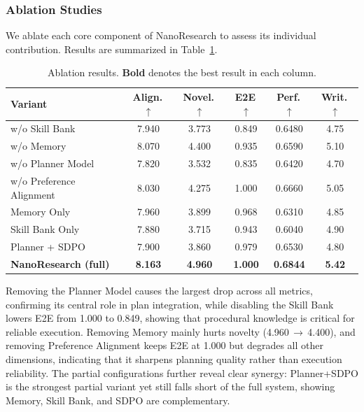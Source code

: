\documentclass{opendatalab}
\begin{document}
\subsubsection{Ablation Studies}

We ablate each core component of NanoResearch to assess its individual
contribution. Results are summarized in Table~\ref{tab:ablation}.

\begin{table}[ht]
  \centering
  \footnotesize
  \caption{Ablation results. \textbf{Bold} denotes the best result in
  each column.}
  \begin{tabular*}{\textwidth}{@{\extracolsep{\fill}}l|ccccc@{}}
    \toprule
    Variant
      & Align.\,$\uparrow$
      & Novel.\,$\uparrow$
      & E2E\,$\uparrow$
      & Perf.\,$\uparrow$
      & Writ.\,$\uparrow$ \\
    \midrule
    w/o Skill Bank            & 7.940 & 3.773 & 0.849 & 0.6480 & 4.75 \\
    w/o Memory                & 8.070 & 4.400 & 0.935 & 0.6590 & 5.10 \\
    w/o Planner Model         & 7.820 & 3.532 & 0.835 & 0.6420 & 4.70 \\
    w/o Preference Alignment  & 8.030 & 4.275 & 1.000 & 0.6660 & 5.05 \\
    \midrule
    Memory Only               & 7.960 & 3.899 & 0.968 & 0.6310 & 4.85 \\
    Skill Bank Only           & 7.880 & 3.715 & 0.943 & 0.6040 & 4.90 \\
    Planner + SDPO            & 7.900 & 3.860 & 0.979 & 0.6530 & 4.80 \\
    \midrule
    \textbf{NanoResearch (full)}
      & \textbf{8.163} & \textbf{4.960} & \textbf{1.000}
      & \textbf{0.6844} & \textbf{5.42} \\
    \bottomrule
  \end{tabular*}
  \label{tab:ablation}
\end{table}

Removing the Planner Model causes the largest drop across all metrics,
confirming its central role in plan integration, while disabling the
Skill Bank lowers E2E from 1.000 to 0.849, showing that procedural
knowledge is critical for reliable execution. Removing Memory mainly
hurts novelty (4.960\,$\rightarrow$\,4.400), and removing Preference
Alignment keeps E2E at 1.000 but degrades all other dimensions,
indicating that it sharpens planning quality rather than execution
reliability. The partial configurations further reveal clear synergy:
Planner+SDPO is the strongest partial variant yet still falls short of
the full system, showing Memory, Skill Bank, and SDPO are
complementary.
\end{document}
